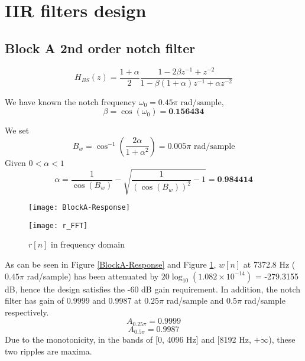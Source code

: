 \documentclass{article}
\newenvironment{homeworkProblem}[1]{
	\section{#1}
	}{
}
\newenvironment{homeworkSection}[1]{
	\subsection{#1}
	}{
}
\begin{document}
\begin{homeworkProblem}{IIR filters design}


\begin{homeworkSection}{Block A 2nd order notch filter}

\begin{equation}
H_{BS}(z) = \frac{1+\alpha}{2} \frac{1-2\beta z^{-1} + z^{-2}}{1 - \beta (1+\alpha) z^{-1} + \alpha z^{-2}}
\end{equation}

We have known the notch frequency $\omega_0 = 0.45\pi \text{ rad/sample}$,
\begin{equation}
\beta = \cos(\omega_0) = \textbf{0.156434}
\end{equation}

We set
\begin{equation}
B_w = \cos^{-1}(\frac{2\alpha}{1+\alpha^2}) = 0.005 \pi \text{ rad/sample}
\end{equation}
Given $0<\alpha<1$
\begin{equation}
\alpha = \frac{1}{\cos(B_w)} - \sqrt{\frac{1}{(\cos(B_w))^2}-1} = \textbf{0.984414}
\end{equation}

\begin{figure}[H]
\begin{minipage}[t]{0.5\linewidth}
\centering
\texttt{[image: BlockA-Response]}
\caption{Block A response}
\label{BlockA-Response}
\end{minipage}
\begin{minipage}[t]{0.5\linewidth}
\centering
\texttt{[image: r\_FFT]}
\caption{$r[n]$ in frequency domain}
\label{r_FFT}
\end{minipage}
\end{figure}

As can be seen in Figure \ref{BlockA-Response} and Figure \ref{r_FFT}, $w[n]$ at 7372.8 Hz ($0.45\pi$ rad/sample) has been attenuated by $20 \log_{10}(1.082 \times 10^{-14})$ = -279.3155 dB, hence the design satisfies the -60 dB gain requirement. In addition, the notch filter has gain of 0.9999 and 0.9987 at $0.25\pi$ rad/sample and $0.5\pi$ rad/sample respectively.
\begin{equation}\label{A025}
A_{0.25\pi} = 0.9999
\end{equation}
\begin{equation}\label{A05}
A_{0.5\pi} = 0.9987
\end{equation}
Due to the monotonicity, in the bands of [0, 4096 Hz] and [8192 Hz, $+\infty$), these two ripples are maxima.


\end{homeworkSection}
\end{homeworkProblem}
\end{document}
